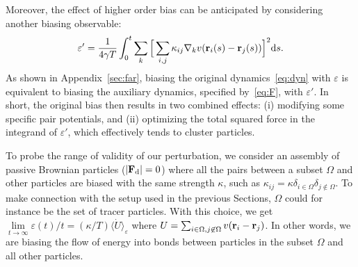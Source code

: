 \documentclass[pre, superscriptaddress, twocolumn,pre]{revtex4-1}
\begin{document}
Moreover, the effect of higher order bias can be anticipated by considering another biasing observable:
\begin{equation}\label{eq:eps_prime}
	\varepsilon' = \frac{1}{4\gamma T}\int_0^t\sum_k\Big[\sum_{i,j}\kappa_{ij}\nabla_kv({\bf r}_i(s)-{\bf r}_j(s))\Big]^2{\rm d}s .
\end{equation}
As shown in Appendix~\ref{sec:far}, biasing the original dynamics~\eqref{eq:dyn} with $\varepsilon$ is equivalent to biasing the auxiliary dynamics, specified by~\eqref{eq:F}, with $\varepsilon'$. In short, the original bias then results in two combined effects: (i) modifying some specific pair potentials, and (ii) optimizing the total squared force in the integrand of $\varepsilon'$, which effectively tends to cluster particles.


To probe the range of validity of our perturbation, we consider an assembly of passive Brownian particles ($|{\bf F}_{\rm d}|=0$) where all the pairs between a subset $\Omega$ and other particles are biased with the same strength $\kappa$, such as $\kappa_{ij}=\kappa\delta_{i\in\Omega}\delta_{j\not\in\Omega}$. To make connection with the setup used in the previous Sections, $\Omega$ could for instance be the set of tracer particles. With this choice, we get $\underset{t\to\infty}{\lim}\varepsilon(t)/t=(\kappa/T)\langle\dot U\rangle_\varepsilon$ where $U = \sum_{i\in\Omega,j\not\in\Omega} v({\bf r}_i-{\bf r}_j)$. In other words, we are biasing the flow of energy into bonds between particles in the subset $\Omega$ and all other particles. 
\end{document}
